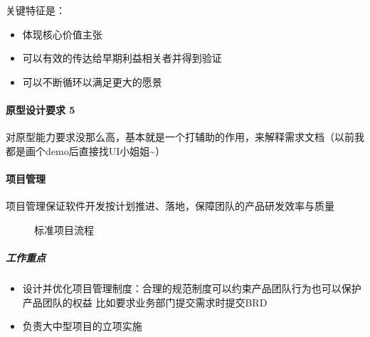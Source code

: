 \documentclass[letterpaper,11pt,english]{sphinxmanual}
\begin{document}
关键特征是：%
\begin{footnote}[58]\sphinxAtStartFootnote
{}
%
\end{footnote}
\begin{itemize}
\item {} 
体现核心价值主张

\item {} 
可以有效的传达给早期利益相关者并得到验证

\item {} 
可以不断循环以满足更大的愿景

\end{itemize}


\paragraph{原型设计要求 5\sphinxfootnotemark[59]}
\label{\detokenize{chapter_introduction/2B:id21}}%
\begin{footnotetext}[59]\sphinxAtStartFootnote
{}
%
\end{footnotetext}\ignorespaces 
对原型能力要求没那么高，基本就是一个打辅助的作用，来解释需求文档（以前我都是画个demo后直接找UI小姐姐\textasciitilde{}）


\paragraph{项目管理}
\label{\detokenize{chapter_introduction/2B:id22}}
项目管理保证软件开发按计划推进、落地，保障团队的产品研发效率与质量

\begin{figure}[H]
\centering
\capstart

\noindent{}
\caption{标准项目流程}\label{\detokenize{chapter_introduction/2B:id40}}\end{figure}


\subparagraph{工作重点}
\label{\detokenize{chapter_introduction/2B:id23}}\begin{itemize}
\item {} 
设计并优化项目管理制度：合理的规范制度可以约束产品团队行为也可以保护产品团队的权益
比如要求业务部门提交需求时提交BRD

\item {} 
负责大中型项目的立项实施

\end{itemize}
\end{document}

